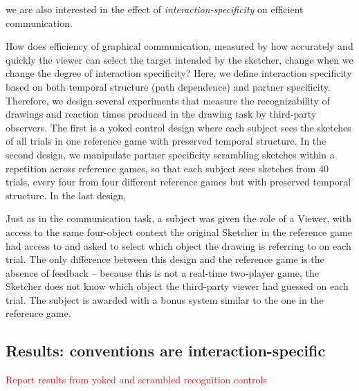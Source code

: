 \documentclass[10pt,letterpaper]{article}
\newcommand{\red}[1]{\textcolor{Red}{#1}}
\begin{document}
  we are also interested in the effect of \emph{interaction-specificity} on efficient communication. 

How does efficiency of graphical communication, measured by how accurately and quickly the viewer can select the target intended by the sketcher, change when we change the degree of interaction specificity? 
Here, we define interaction specificity based on both temporal structure (path dependence) and partner specificity. 
Therefore, we design several experiments that measure the recognizability of drawings and reaction times produced in the drawing task by third-party observers. 
The first is a yoked control design where each subject sees the sketches of all trials in one reference game with preserved temporal structure. 
In the second design, we manipulate partner specificity scrambling sketches within a repetition across reference games, so that each subject sees sketches from 40 trials, every four from four different reference games but with preserved temporal structure. In the last design,

Just as in the communication task, a subject was given the role of a Viewer, with access to the same four-object context the original Sketcher in the reference game had access to and asked to select which object the drawing is referring to on each trial. 
The only difference between this design and the reference game is the absence of feedback -- because this is not a real-time two-player game, the Sketcher does not know which object the third-party viewer had guessed on each trial. 
The subject is awarded with a bonus system similar to the one in the reference game.

\subsection{Results: conventions are interaction-specific}

\red{Report results from yoked and scrambled recognition controls}

\end{document}
